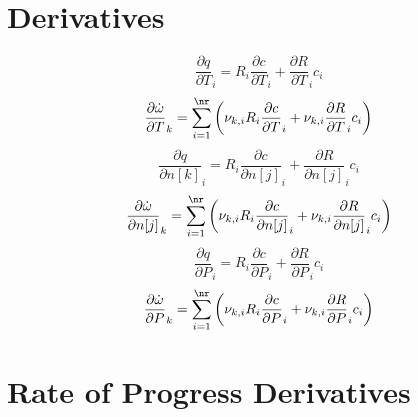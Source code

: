 \documentclass[a4paper,10pt]{article}
\begin{document}
\section{Derivatives}
\begin{dmath} \frac{\partial q }{\partial T }_{i} = R_{i} \frac{\partial c }{\partial T }_{i} + \frac{\partial R }{\partial T }_{i} c_{i}\end{dmath} 
\begin{dmath} \frac{\partial \dot{\omega} }{\partial T }_{k} = \sum_{i=1}^{\nr} \left(\nu_{k,i} R_{i} \frac{\partial c }{\partial T }_{i} + \nu_{k,i} \frac{\partial R }{\partial T }_{i} c_{i}\right)\end{dmath} 
\begin{dmath} \frac{\partial q }{\partial n[k] }_{i} = R_{i} \frac{\partial c }{\partial n[j] }_{i} + \frac{\partial R }{\partial n[j] }_{i} c_{i}\end{dmath} 
\begin{dmath} \frac{\partial \dot{\omega} }{\partial n[j] }_{k} = \sum_{i=1}^{\nr} \left(\nu_{k,i} R_{i} \frac{\partial c }{\partial n[j] }_{i} + \nu_{k,i} \frac{\partial R }{\partial n[j] }_{i} c_{i}\right)\end{dmath} 
\begin{dmath} \frac{\partial q }{\partial P }_{i} = R_{i} \frac{\partial c }{\partial P }_{i} + \frac{\partial R }{\partial P }_{i} c_{i}\end{dmath} 
\begin{dmath} \frac{\partial \dot{\omega} }{\partial P }_{k} = \sum_{i=1}^{\nr} \left(\nu_{k,i} R_{i} \frac{\partial c }{\partial P }_{i} + \nu_{k,i} \frac{\partial R }{\partial P }_{i} c_{i}\right)\end{dmath} 
\section{Rate of Progress Derivatives}
\end{document}
